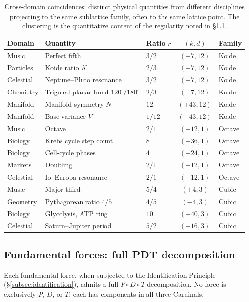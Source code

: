 \documentclass[11pt,a4paper]{article}
\theoremstyle{definition}
\theoremstyle{remark}
\begin{document}
\begin{table}[h]
\centering
\small
\begin{tabular}{@{}l l l c l@{}}
\toprule
Domain & Quantity & Ratio $r$ & $(k,d)$ & Family\\
\midrule
Music & Perfect fifth & $3/2$ & $(+7, 12)$ & Koide\\
Particles & Koide ratio $K$ & $2/3$ & $(-7, 12)$ & Koide\\
Celestial & Neptune--Pluto resonance & $3/2$ & $(+7, 12)$ & Koide\\
Chemistry & Trigonal-planar bond $120^{\circ}/180^{\circ}$ & $2/3$ & $(-7, 12)$ & Koide\\
Manifold & Manifold symmetry $N$ & $12$ & $(+43, 12)$ & Koide\\
Manifold & Base variance $V$ & $1/12$ & $(-43, 12)$ & Koide\\
\addlinespace
Music & Octave & $2/1$ & $(+12, 1)$ & Octave\\
Biology & Krebs cycle step count & $8$ & $(+36, 1)$ & Octave\\
Biology & Cell-cycle phases & $4$ & $(+24, 1)$ & Octave\\
Markets & Doubling & $2/1$ & $(+12, 1)$ & Octave\\
Celestial & Io--Europa resonance & $2/1$ & $(+12, 1)$ & Octave\\
\addlinespace
Music & Major third & $5/4$ & $(+4, 3)$ & Cubic\\
Geometry & Pythagorean ratio $4/5$ & $4/5$ & $(-4, 3)$ & Cubic\\
Biology & Glycolysis, ATP ring & $10$ & $(+40, 3)$ & Cubic\\
Celestial & Saturn--Jupiter period & $5/2$ & $(+16, 3)$ & Cubic\\
\bottomrule
\end{tabular}
\caption{Cross-domain coincidences: distinct physical quantities from different disciplines projecting to the same sublattice family, often to the same lattice point. The clustering is the quantitative content of the regularity noted in \S1.1.}
\label{tab:cross}
\end{table}

\subsection{Fundamental forces: full PDT decomposition}\label{subsec:forces-PDT}

Each fundamental force, when subjected to the Identification Principle (\S\ref{subsec:identification}), admits a full $P \circ D \circ T$ decomposition. No force is exclusively $P$, $D$, or $T$; each has components in all three Cardinals.
\end{document}
